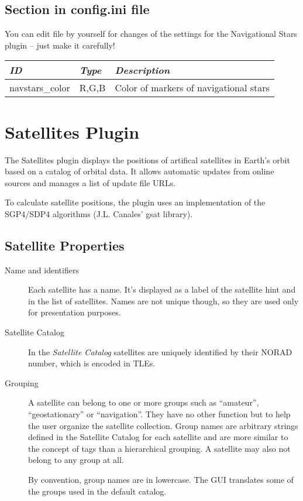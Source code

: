 \subsection{Section  in config.ini file}
\label{sec:plugins:NavigationalStars:config}

You can edit  file by yourself for changes of the
settings for the Navigational Stars plugin -- just make it carefully!

\begin{longtabu} to \textwidth {l|l|X}\toprule
\emph{ID}            & \emph{Type} & \emph{Description}\\\midrule
navstars\_color          & R,G,B & Color of markers of navigational stars  \\\bottomrule
\end{longtabu}


\section{Satellites Plugin}
\label{sec:plugins:Satellites}


The Satellites plugin displays the positions of artifical satellites
in Earth's orbit based on a catalog of orbital data. It allows
automatic updates from online sources and manages a list of update
file URLs.

To calculate satellite positions, the plugin uses an implementation of
the SGP4/SDP4 algorithms (J.L. Canales' gsat library).

\subsection{Satellite Properties}
\label{sec:plugins:Satellites:properties}

\begin{description}
\item[Name and identifiers] Each satellite has a name. It's displayed as a label of the satellite hint and in the list of satellites. Names are not unique though, so they are used only
for presentation purposes.

\item[Satellite Catalog] In the \emph{Satellite Catalog} satellites are uniquely identified by their NORAD number, which is encoded in TLEs.

\item[Grouping]
A satellite can belong to one or more groups such as ``amateur'',
``geostationary'' or ``navigation''. They have no other function but
to help the user organize the satellite collection.  Group names are
arbitrary strings defined in the Satellite Catalog for each satellite
and are more similar to the concept of tags than a hierarchical
grouping. A satellite may also not belong to any group at all.

By convention, group names are in lowercase. The GUI translates some of the groups used in the default catalog.
\end{description}

